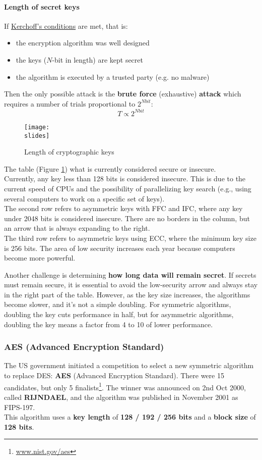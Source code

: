 \paragraph*{Length of secret keys}
If \ul{Kerchoff's conditions} are met, that is:
\begin{itemize}
    \item the encryption algorithm was well designed
    \item the keys ($N$-bit in length) are kept secret
    \item the algorithm is executed by a trusted party (e.g. no malware)
\end{itemize}
Then the only possible attack is the \textbf{brute force} (exhaustive) \textbf{attack} which requires a number of trials proportional to $2^{N bit}$:
\[
    T \propto 2^{N bit}
\]


\begin{figure}[h]
    \centering
    \texttt{[image: \\slides]}
    \caption{Length of cryptographic keys}
    \label{fig:cryptolength}
\end{figure}

The table (Figure \ref{fig:cryptolength}) what is currently considered secure or insecure.\\
Currently, any key less than 128 bits is considered insecure.
This is due to the current speed of CPUs and the possibility of parallelizing key search (e.g., using several computers to work on a specific set of keys).\\
The second row refers to asymmetric keys with FFC and IFC, where any key under 2048 bits is considered insecure.
There are no borders in the column, but an arrow that is always expanding to the right. \\
The third row refers to asymmetric keys using ECC, where the minimum key size is 256 bits.
The area of low security increases each year because computers become more powerful.

Another challenge is determining \textbf{how long data will remain secret}.
If secrets must remain secure, it is essential to avoid the low-security arrow and always stay in the right part of the table.
However, as the key size increases, the algorithms become slower, and it's not a simple doubling.
For symmetric algorithms, doubling the key cuts performance in half, but for asymmetric algorithms, doubling the key means a factor from 4 to 10 of lower performance.


\subsubsection{AES (Advanced Encryption Standard)}
The US government initiated a competition to select a new symmetric algorithm to replace DES: \textbf{AES} (Advanced Encryption Standard). There were 15 candidates, but only 5 finalists\footnote{\url{www.nist.gov/aes}}. The winner was announced on 2nd Oct 2000, called \textbf{RIJNDAEL}, and the algorithm was published in November 2001 as FIPS-197.\\
This algorithm uses a \textbf{key length} of \textbf{128 / 192 / 256 bits} and a \textbf{block size} of \textbf{128 bits}.

